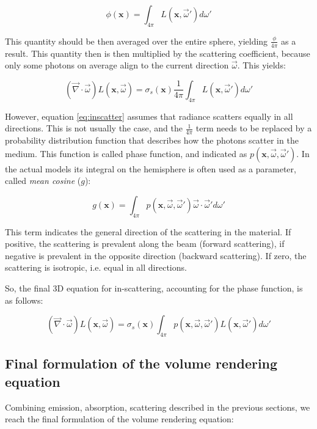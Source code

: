 $$
\phi(\mathbf{x}) = \int_{4\pi} L(\mathbf{x},\vec{\omega}') d\omega'
$$

This quantity should be then averaged over the entire sphere, yielding $\frac{\phi}{4\pi}$ as a result. This quantity then is then multiplied by the scattering coefficient, because only some photons on average align to the current direction $\vec{\omega}$. This yields:

\begin{equation}
(\vec{\nabla} \cdot \vec{\omega}) L(\mathbf{x}, \vec{\omega}) = \sigma_s(\mathbf{x}) \frac{1}{4 \pi} \int_{4\pi} L(\mathbf{x},\vec{\omega}') d\omega'	
\label{eq:inscatter}
\end{equation}


However, equation \ref{eq:inscatter} assumes that radiance scatters equally in all directions. This is not usually the case, and the $\frac{1}{4 \pi}$ term needs to be replaced by a probability distribution function that describes how the photons scatter in the medium. This function is called phase function, and indicated as $p(\mathbf{x}, \vec{\omega}, \vec{\omega}')$. In the actual models its integral on the hemisphere is often used as a parameter, called \emph{mean cosine} ($g$):

$$
g(\mathbf{x}) = \int_{4 \pi} p(\mathbf{x}, \vec{\omega}, \vec{\omega}') \vec{\omega} \cdot \vec{\omega}' d \omega'
$$

This term indicates the general direction of the scattering in the material. If positive, the scattering is prevalent along the beam (forward scattering), if negative is prevalent in the opposite direction (backward scattering). If zero, the scattering is isotropic, i.e. equal in all directions.

So, the final 3D equation for in-scattering, accounting for the phase function, is as follows:

\begin{equation}
(\vec{\nabla} \cdot \vec{\omega}) L(\mathbf{x}, \vec{\omega}) = \sigma_s(\mathbf{x}) \int_{4\pi} p(\mathbf{x}, \vec{\omega}, \vec{\omega}') L(\mathbf{x},\vec{\omega}') d\omega'	
\label{eq:inscatter}
\end{equation}

\subsection{Final formulation of the volume rendering equation}
Combining emission, absorption, scattering described in the previous sections, we reach the final formulation of the volume rendering equation:


